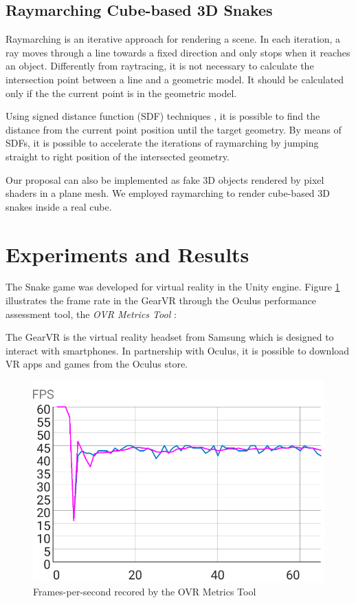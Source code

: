 \documentclass[runningheads]{llncs}
\begin{document}
\subsection{Raymarching Cube-based 3D Snakes}
\label{subsec:raymarching-snakes}
Raymarching is an iterative approach for rendering a scene. In each iteration, a ray moves through a line towards a fixed direction and only stops when it reaches an object. Differently from raytracing, it is not necessary to calculate the intersection point between a line and a geometric model. It should be calculated only if the the current point is in the geometric model.

Using signed distance function (SDF) techniques \cite{hart1996sphere}, it is possible to find the distance from the current point position until the target geometry. By means of SDFs, it is possible to accelerate the iterations of raymarching by jumping straight to right position of the intersected geometry.

Our proposal can also be implemented as fake 3D objects rendered by pixel shaders in a plane mesh. We employed raymarching to render cube-based 3D snakes inside a real cube.

\section{Experiments and Results} \label{sec:results}

The Snake game was developed for virtual reality in the Unity engine. Figure \ref{fig:VRPerformanceChart}  illustrates the frame rate in the GearVR through the Oculus performance assessment tool, the \textit{OVR Metrics Tool} \cite{ovrmetrictool}:

The GearVR is the virtual reality headset from Samsung which is designed to interact with smartphones. In partnership with Oculus, it is possible to download VR apps and games from the Oculus store.

\begin{figure}[h]
\centering
\includegraphics[width=0.9\linewidth]{src/hci2020-images/VRPerformance.png}
\caption{Frames-per-second recored by the OVR Metrics Tool}
\label{fig:VRPerformanceChart}
\end{figure}
\end{document}

